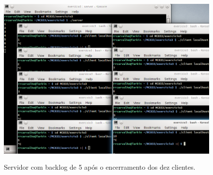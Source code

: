 \documentclass[a4paper,10pt,oneside,final,titlepage,onecolumn]{article}
\begin{document}
\begin{figure}[!ht]
  \caption{Servidor com backlog de 5 após o encerramento dos dez clientes.}
  \centering
  \includegraphics[width=117mm]{images/multiplos3.png}
  \label{multiplos3}
\end{figure}
\end{document}
